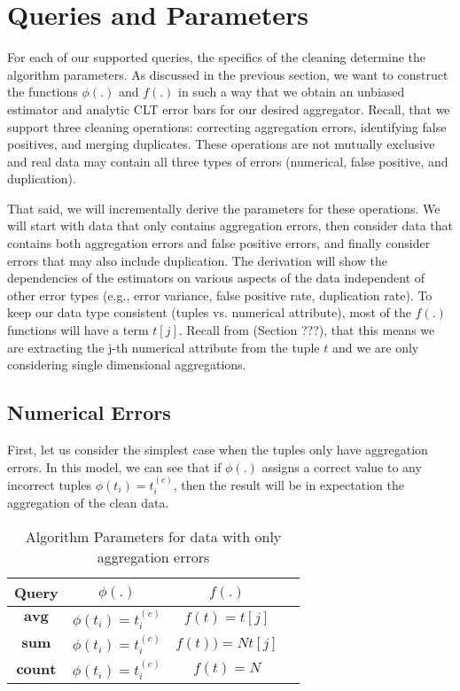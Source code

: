 \section{Queries and Parameters}
For each of our supported queries, the specifics of the cleaning determine the algorithm parameters.
As discussed in the previous section, we want to construct the functions $\phi(.)$ and $f(.)$ in such a way that we obtain an unbiased estimator and analytic CLT error bars for our desired aggregator.
Recall, that we support three cleaning operations: correcting aggregation errors, identifying false positives, and merging duplicates.
These operations are not mutually exclusive and real data may contain all three types of errors (numerical, false positive, and duplication).

That said, we will incrementally derive the parameters for these operations.
We will start with data that only contains aggregation errors, then consider data that contains both aggregation errors and false positive errors, and finally consider errors that may also include duplication.
The derivation will show the dependencies of the estimators on various aspects of the data independent of other error types (e.g., error variance, false positive rate, duplication rate).  
To keep our data type consistent (tuples vs. numerical attribute), most of the $f(.)$ functions will have a term $t[j]$.
Recall from (Section ???), that this means we are extracting the j-th numerical attribute from the tuple $t$ and we are only considering single dimensional aggregations.

\subsection{Numerical Errors}
First, let us consider the simplest case when the tuples only have aggregation errors.
In this model, we can see that if $\phi(.)$ assigns a correct value to any incorrect tuples $\phi(t_i)= t_i^{(c)}$, then the result will be in expectation the aggregation of the clean data.
\begin{table}[!ht]
\caption{Algorithm Parameters for data with only aggregation errors}
\centering 
\begin{tabular}{c c c c}
\hline\hline
Query & $\phi(.)$ & $f(.)$ \\ 
\hline  %
$\textbf{avg}$ & $\phi(t_i)=t_i^{(c)}$ &$f(t)=t[j]$ \\ %
$\textbf{sum}$ & $\phi(t_i)=t_i^{(c)}$ & $f(t))=Nt[j]$ \\
$\textbf{count}$ & $\phi(t_i)=t_i^{(c)}$ & $f(t)= N$ \\ [1ex] %
\hline %
\end{tabular}
\end{table}

